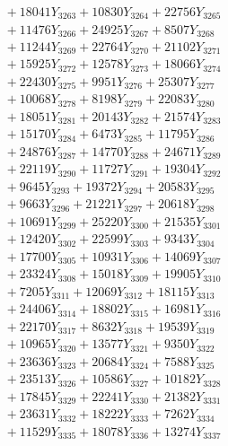 \documentclass[a4paper,10pt]{article}
\begin{document}
{\begin{align}
&\;  + 18041 Y_{3263} + 10830 Y_{3264} + 22756 Y_{3265} \\[0.3ex]
&\;  + 11476 Y_{3266} + 24925 Y_{3267} + 8507 Y_{3268} \\[0.5ex]\allowbreak
&\;  + 11244 Y_{3269} + 22764 Y_{3270} + 21102 Y_{3271} \\[0.3ex]
&\;  + 15925 Y_{3272} + 12578 Y_{3273} + 18066 Y_{3274} \\[0.3ex]
&\;  + 22430 Y_{3275} + 9951 Y_{3276} + 25307 Y_{3277} \\[0.3ex]
&\;  + 10068 Y_{3278} + 8198 Y_{3279} + 22083 Y_{3280} \\[0.3ex]
&\;  + 18051 Y_{3281} + 20143 Y_{3282} + 21574 Y_{3283} \\[0.3ex]
&\;  + 15170 Y_{3284} + 6473 Y_{3285} + 11795 Y_{3286} \\[0.3ex]
&\;  + 24876 Y_{3287} + 14770 Y_{3288} + 24671 Y_{3289} \\[0.3ex]
&\;  + 22119 Y_{3290} + 11727 Y_{3291} + 19304 Y_{3292} \\[0.3ex]
&\;  + 9645 Y_{3293} + 19372 Y_{3294} + 20583 Y_{3295} \\[0.3ex]
&\;  + 9663 Y_{3296} + 21221 Y_{3297} + 20618 Y_{3298} \\[0.5ex]\allowbreak
&\;  + 10691 Y_{3299} + 25220 Y_{3300} + 21535 Y_{3301} \\[0.3ex]
&\;  + 12420 Y_{3302} + 22599 Y_{3303} + 9343 Y_{3304} \\[0.3ex]
&\;  + 17700 Y_{3305} + 10931 Y_{3306} + 14069 Y_{3307} \\[0.3ex]
&\;  + 23324 Y_{3308} + 15018 Y_{3309} + 19905 Y_{3310} \\[0.3ex]
&\;  + 7205 Y_{3311} + 12069 Y_{3312} + 18115 Y_{3313} \\[0.3ex]
&\;  + 24406 Y_{3314} + 18802 Y_{3315} + 16981 Y_{3316} \\[0.3ex]
&\;  + 22170 Y_{3317} + 8632 Y_{3318} + 19539 Y_{3319} \\[0.3ex]
&\;  + 10965 Y_{3320} + 13577 Y_{3321} + 9350 Y_{3322} \\[0.3ex]
&\;  + 23636 Y_{3323} + 20684 Y_{3324} + 7588 Y_{3325} \\[0.3ex]
&\;  + 23513 Y_{3326} + 10586 Y_{3327} + 10182 Y_{3328} \\[0.5ex]\allowbreak
&\;  + 17845 Y_{3329} + 22241 Y_{3330} + 21382 Y_{3331} \\[0.3ex]
&\;  + 23631 Y_{3332} + 18222 Y_{3333} + 7262 Y_{3334} \\[0.3ex]
&\;  + 11529 Y_{3335} + 18078 Y_{3336} + 13274 Y_{3337} \\[0.3ex]

\end{align}}
\end{document}

